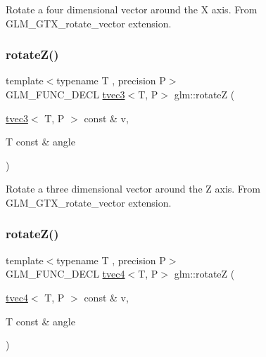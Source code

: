 Rotate a four dimensional vector around the X axis. From G\+L\+M\+\_\+\+G\+T\+X\+\_\+rotate\+\_\+vector extension. \mbox{\label{group__gtx__rotate__vector_gae30ac01b89d4f16a972fee696c964908}} 
\subsubsection{\texorpdfstring{rotate\+Z()}{rotateZ()}\hspace{0.1cm}{\footnotesize\ttfamily [1/2]}}
{\footnotesize\ttfamily template$<$typename T , precision P$>$ \\
G\+L\+M\+\_\+\+F\+U\+N\+C\+\_\+\+D\+E\+CL \hyperlink{structglm_1_1tvec3}{tvec3}$<$T, P$>$ glm\+::rotateZ (\begin{DoxyParamCaption}\item[{\hyperlink{structglm_1_1tvec3}{tvec3}$<$ T, P $>$ const \&}]{v,  }\item[{T const \&}]{angle }\end{DoxyParamCaption})}

Rotate a three dimensional vector around the Z axis. From G\+L\+M\+\_\+\+G\+T\+X\+\_\+rotate\+\_\+vector extension. \mbox{\label{group__gtx__rotate__vector_ga034e5d197ab4bd8685624bc2cf16e586}} 
\subsubsection{\texorpdfstring{rotate\+Z()}{rotateZ()}\hspace{0.1cm}{\footnotesize\ttfamily [2/2]}}
{\footnotesize\ttfamily template$<$typename T , precision P$>$ \\
G\+L\+M\+\_\+\+F\+U\+N\+C\+\_\+\+D\+E\+CL \hyperlink{structglm_1_1tvec4}{tvec4}$<$T, P$>$ glm\+::rotateZ (\begin{DoxyParamCaption}\item[{\hyperlink{structglm_1_1tvec4}{tvec4}$<$ T, P $>$ const \&}]{v,  }\item[{T const \&}]{angle }\end{DoxyParamCaption})}


